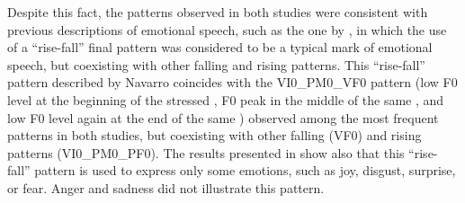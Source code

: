 \documentclass[output=paper]{langsci/langscibook}
\begin{document}
Despite this fact, the patterns observed in both studies were consistent with previous descriptions of  emotional speech, such as the one by \citet{NavarroTomas.1944}, in which the use of a ``rise-fall'' final pattern was considered to be a typical mark of emotional speech, but coexisting with other falling and rising patterns. This ``rise-fall'' pattern described by Navarro coincides with the VI0\_PM0\_VF0 pattern (low F0 level at the beginning of the stressed , F0 peak in the middle of the same , and low F0 level again at the end of the same ) observed among the most frequent patterns in both studies, but coexisting with other falling (VF0) and rising patterns (VI0\_PM0\_PF0). The results presented in  show also that this ``rise-fall'' pattern is used to express only some emotions, such as joy, disgust, surprise, or fear. Anger and sadness did not illustrate this pattern.
\end{document}
